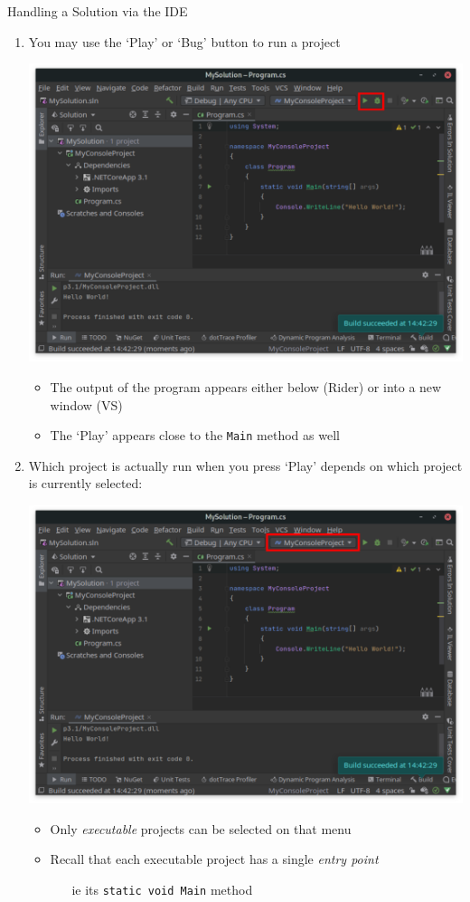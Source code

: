 \documentclass[presentation]{beamer}
\begin{document}
\begin{frame}[allowframebreaks]{Handling a Solution via the IDE}
\begin{enumerate}
        \framebreak

        \item You may use the \alert{`Play'} or \alert{`Bug'} button to run a project
        \begin{center}
            \includegraphics[width=.6\linewidth]{img/rider-4a}
        \end{center}
        \begin{itemize}
            \item The output of the program appears either below (Rider) or into a new window (VS)
            \item The `Play' appears close to the \texttt{Main} method as well
        \end{itemize}

        \framebreak

        \item Which project is actually run when you press `Play' depends on which project is currently selected:
        \begin{center}
            \includegraphics[width=.6\linewidth]{img/rider-4b}
        \end{center}
        \begin{itemize}
            \item Only \emph{executable} projects can be selected on that menu
            \item Recall that each executable project has a single \emph{entry point}
            \begin{itemize}
                \item[ie] its \alert{\texttt{static void Main}} method
            \end{itemize}
        \end{itemize}


\end{enumerate}
\end{frame}
\end{document}
